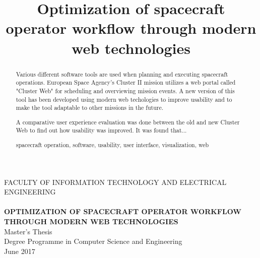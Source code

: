 \documentclass[a4paper, 12pt,titlepage]{dithesis}
\title{Optimization of spacecraft operator workflow through modern web technologies}
\begin{document}
\begin{titlepage}
	{\sffamily\fontsize{9}{1pt}\selectfont FACULTY OF INFORMATION TECHNOLOGY AND ELECTRICAL ENGINEERING\\}
	\vspace{65 mm}
	{\textbf{\fontsize{16}{19pt}\selectfont \getfirstname\ \getlastname }\\}
	\vspace{15 mm}
	{\textbf{\fontsize{18}{22pt}\selectfont OPTIMIZATION OF SPACECRAFT OPERATOR WORKFLOW THROUGH MODERN WEB TECHNOLOGIES\\}}
	\vspace{53 mm}
	{\fontsize{14}{17}\selectfont Master's Thesis \\Degree Programme in Computer Science and Engineering \\ June 2017\\}
\end{titlepage}


\begin{abstract}
Various different software tools are used when planning and executing spacecraft operations. European Space Agency's Cluster II mission utilizes a web portal called "Cluster Web" for scheduling and overviewing mission events. A new version of this tool has been developed using modern web techologies to improve usability and to make the tool adaptable to other missions in the future. 

A comparative user experience evaluation was done between the old and new Cluster Web to find out how usability was improved. It was found that...

\keywords spacecraft operation, software, usability, user interface, visualization, web

\end{abstract}
\end{document}
